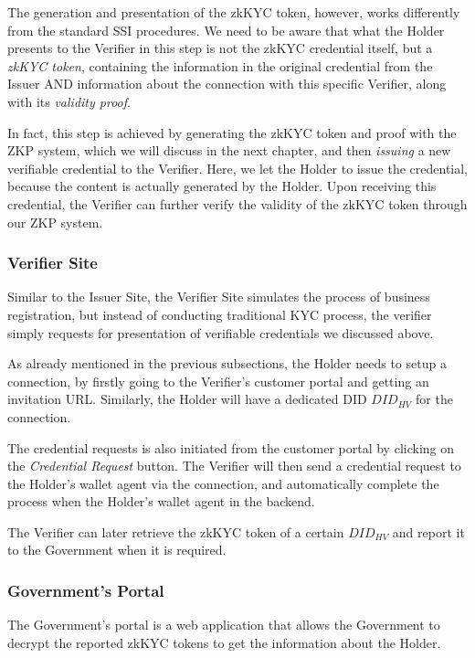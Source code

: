 \documentclass[
]{report}
\begin{document}
The generation and presentation of the zkKYC token, however, works
differently from the standard SSI procedures. We need to be aware that
what the Holder presents to the Verifier in this step is not the zkKYC
credential itself, but a \emph{zkKYC token}, containing the information in
the original credential from the Issuer AND information about the connection
with this specific Verifier, along with its \emph{validity proof}.

In fact, this step is achieved by generating the zkKYC token and proof
with the ZKP system, which we will discuss in the next chapter, and then
\emph{issuing} a new verifiable credential to the Verifier. Here, we let
the Holder to issue the credential, because the content is actually
generated by the Holder. Upon receiving this credential, the Verifier
can further verify the validity of the zkKYC token through our ZKP system.

\subsubsection{Verifier Site}
Similar to the Issuer Site, the Verifier Site simulates the process of
business registration, but instead of conducting traditional KYC process,
the verifier simply requests for presentation of verifiable credentials
we discussed above.

As already mentioned in the previous subsections, the Holder needs to
setup a connection, by firstly going to the Verifier's customer portal and
getting an invitation URL. Similarly, the Holder will have a dedicated DID
$DID_{HV}$ for the connection.

The credential requests is also initiated from the customer portal by
clicking on the \emph{Credential Request} button. The Verifier will then
send a credential request to the Holder's wallet agent via the connection,
and automatically complete the process when the Holder's wallet agent in
the backend.

The Verifier can later retrieve the zkKYC token of a certain ${DID_{HV}}$
and report it to the Government when it is required.

\subsubsection{Government's Portal}
The Government's portal is a web application that allows the Government to
decrypt the reported zkKYC tokens to get the information about the Holder.
\end{document}
